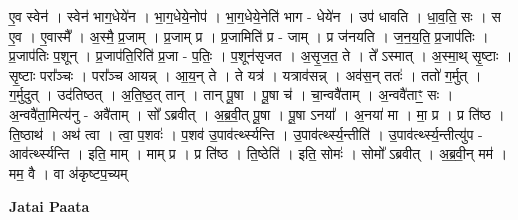 \documentclass[17pt]{extarticle}
\begin{document}
ए॒व स्वेन॑ । स्वेन॑ भाग॒धेये॑न । भा॒ग॒धेये॒नोप॑ । भा॒ग॒धेये॒नेति॑ भाग - धेये॑न । उप॑ धावति । धा॒व॒ति॒ सः । 
स ए॒व । ए॒वास्मै᳚ । अ॒स्मै॒ प्र॒जाम् । प्र॒जाम् प्र । प्र॒जामिति॑ प्र - जाम् । प्र ज॑नयति । ज॒न॒य॒ति॒ प्र॒जाप॑तिः । प्र॒जाप॑तिः प॒शून् । प्र॒जाप॑ति॒रिति॑ प्र॒जा - प॒तिः॒ । प॒शून॑सृजत । अ॒सृ॒ज॒त॒ ते । ते᳚ ऽस्मात् । अ॒स्मा॒थ् सृ॒ष्टाः । सृ॒ष्टाः परा᳚ञ्चः । परा᳚ञ्च आयन्न् । आ॒य॒न् ते । ते यत्र॑ । यत्राव॑सन्न् । अव॑स॒न् ततः॑ । ततो॑ ग॒र्मुत् । ग॒र्मुदुत् । उद॑तिष्ठत् । अ॒ति॒ष्ठ॒त् तान् । तान् पू॒षा । पू॒षा च॑ । चा॒न्ववै॑ताम् । अ॒न्ववै॑ताꣳ॒॒ सः । अ॒न्ववै॑ता॒मित्य॑नु - अवै॑ताम् । सो᳚ ऽब्रवीत् । अ॒ब्र॒वी॒त् पू॒षा । पू॒षा ऽनया᳚ । अ॒नया॑ मा । मा॒ प्र । प्र ति॑ष्ठ । ति॒ष्ठाथ॑ । अथ॑ त्वा । त्वा॒ प॒शवः॑ । प॒शव॑ उ॒पाव॑र्त्थ्स्यन्ति । उ॒पाव॑र्त्थ्स्य॒न्तीति॑ । उ॒पाव॑र्त्थ्स्य॒न्तीत्यु॑प - आव॑र्त्थ्स्यन्ति । इति॒ माम् । माम् प्र । प्र ति॑ष्ठ । ति॒ष्ठेति॑ । इति॒ सोमः॑ । सोमो᳚ ऽब्रवीत् । अ॒ब्र॒वी॒न् मम॑ । मम॒ वै । वा अ॑कृष्टप॒च्यम् \newline

\textbf{Jatai Paata} \newline
\end{document}
